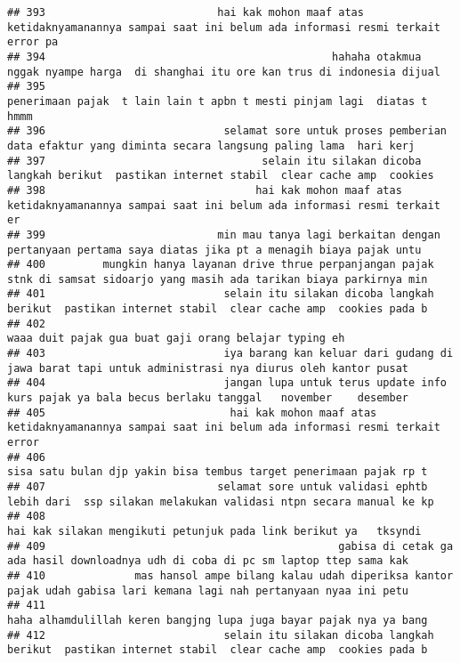 \documentclass[
]{article}
\begin{document}
\begin{verbatim}
## 393                           hai kak mohon maaf atas ketidaknyamanannya sampai saat ini belum ada informasi resmi terkait error pa 
## 394                                             hahaha otakmua nggak nyampe harga  di shanghai itu ore kan trus di indonesia dijual 
## 395                                                          penerimaan pajak  t lain lain t apbn t mesti pinjam lagi  diatas t hmmm
## 396                            selamat sore untuk proses pemberian data efaktur yang diminta secara langsung paling lama  hari kerj 
## 397                                  selain itu silakan dicoba langkah berikut  pastikan internet stabil  clear cache amp  cookies  
## 398                                 hai kak mohon maaf atas ketidaknyamanannya sampai saat ini belum ada informasi resmi terkait er 
## 399                           min mau tanya lagi berkaitan dengan pertanyaan pertama saya diatas jika pt a menagih biaya pajak untu 
## 400         mungkin hanya layanan drive thrue perpanjangan pajak stnk di samsat sidoarjo yang masih ada tarikan biaya parkirnya min 
## 401                            selain itu silakan dicoba langkah berikut  pastikan internet stabil  clear cache amp  cookies pada b 
## 402                                                                            waaa duit pajak gua buat gaji orang belajar typing eh
## 403                            iya barang kan keluar dari gudang di jawa barat tapi untuk administrasi nya diurus oleh kantor pusat 
## 404                            jangan lupa untuk terus update info kurs pajak ya bala becus berlaku tanggal   november    desember  
## 405                             hai kak mohon maaf atas ketidaknyamanannya sampai saat ini belum ada informasi resmi terkait error  
## 406                                                              sisa satu bulan djp yakin bisa tembus target penerimaan pajak rp t 
## 407                           selamat sore untuk validasi ephtb lebih dari  ssp silakan melakukan validasi ntpn secara manual ke kp 
## 408                                                                hai kak silakan mengikuti petunjuk pada link berikut ya   tksyndi
## 409                                              gabisa di cetak ga ada hasil downloadnya udh di coba di pc sm laptop ttep sama kak 
## 410              mas hansol ampe bilang kalau udah diperiksa kantor pajak udah gabisa lari kemana lagi nah pertanyaan nyaa ini petu 
## 411                                                              haha alhamdulillah keren bangjng lupa juga bayar pajak nya ya bang 
## 412                            selain itu silakan dicoba langkah berikut  pastikan internet stabil  clear cache amp  cookies pada b 

\end{verbatim}
\end{document}
